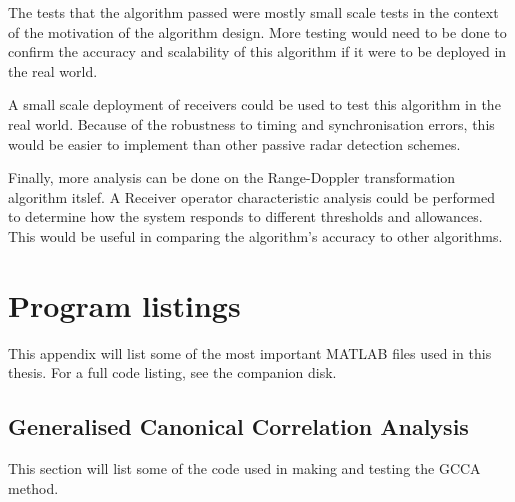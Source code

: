 \documentclass[12pt,openany,a4paper]{book}
\begin{document}
\bigskip

The tests that the algorithm passed were mostly small scale tests in the context of the motivation of the algorithm design. More testing would need to be done to confirm the accuracy and scalability of this algorithm if it were to be deployed in the real world.

\bigskip

A small scale deployment of receivers could be used to test this algorithm in the real world. Because of the robustness to timing and synchronisation errors, this would be easier to implement than other passive radar detection schemes. 

\bigskip

Finally, more analysis can be done on the Range-Doppler transformation algorithm itslef. A Receiver operator characteristic analysis could be performed to determine how the system responds to different thresholds and allowances. This would be useful in comparing the algorithm's accuracy to other algorithms.


\appendix


\newpage
{}
\mbox{}
\newpage



\chapter{Program listings}

This appendix will list some of the most important MATLAB files used in this thesis. For a full code listing, see the companion disk.

\section{Generalised Canonical Correlation Analysis}
This section will list some of the code used in making and testing the GCCA method.
\end{document}
